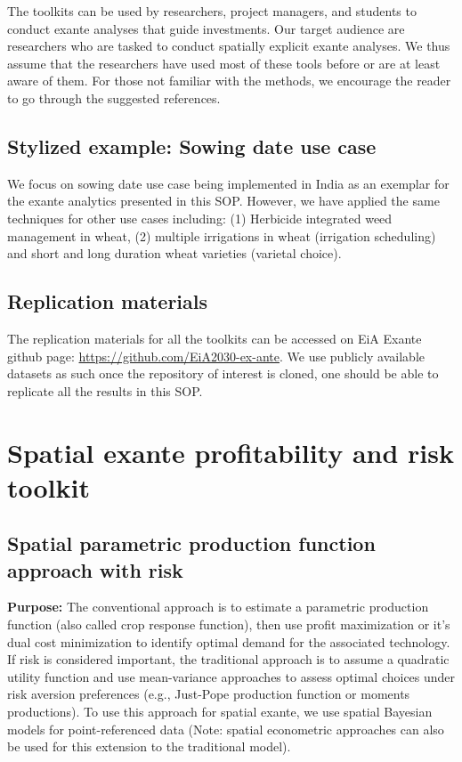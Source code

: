 \documentclass[
  letterpaper,
  DIV=11,
  numbers=noendperiod]{scrreprt}
\begin{document}
The toolkits can be used by researchers, project managers, and students
to conduct exante analyses that guide investments. Our target audience
are researchers who are tasked to conduct spatially explicit exante
analyses. We thus assume that the researchers have used most of these
tools before or are at least aware of them. For those not familiar with
the methods, we encourage the reader to go through the suggested
references.

\section{Stylized example: Sowing date use
case}\label{stylized-example-sowing-date-use-case}

We focus on sowing date use case being implemented in India as an
exemplar for the exante analytics presented in this SOP. However, we
have applied the same techniques for other use cases including: (1)
Herbicide integrated weed management in wheat, (2) multiple irrigations
in wheat (irrigation scheduling) and short and long duration wheat
varieties (varietal choice).

\section{Replication materials}\label{replication-materials}

The replication materials for all the toolkits can be accessed on EiA
Exante github page: \url{https://github.com/EiA2030-ex-ante}. We use
publicly available datasets as such once the repository of interest is
cloned, one should be able to replicate all the results in this SOP.~


\chapter{Spatial exante profitability and risk
toolkit}\label{spatial-exante-profitability-and-risk-toolkit}

\section{Spatial parametric production function approach with
risk}\label{spatial-parametric-production-function-approach-with-risk}

\textbf{Purpose:} The conventional approach is to estimate a parametric
production function (also called crop response function), then use
profit maximization or it's dual cost minimization to identify optimal
demand for the associated technology. If risk is considered important,
the traditional approach is to assume a quadratic utility function and
use mean-variance approaches to assess optimal choices under risk
aversion preferences (e.g., Just-Pope production function or moments
productions). To use this approach for spatial exante, we use spatial
Bayesian models for point-referenced data (Note: spatial econometric
approaches can also be used for this extension to the traditional
model).
\end{document}
